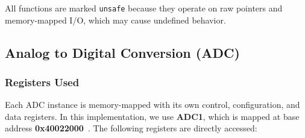 \documentclass[12pt,a4paper]{article}
\begin{document}
All functions are marked \texttt{unsafe} because they operate 
on raw pointers and memory-mapped I/O, which may cause undefined behavior.

\subsection{Analog to Digital Conversion (ADC)}

\subsubsection{Registers Used}

Each ADC instance is memory-mapped with its own control, configuration, and data registers. In this implementation, we use \textbf{ADC1}, which is mapped at base address \textbf{0x40022000}~\cite[pp.~134]{ref-manual}. The following registers are directly accessed:
\end{document}
